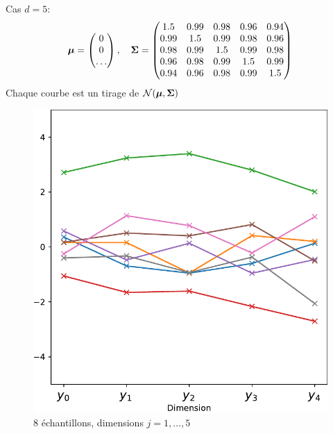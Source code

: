 \documentclass[xcolor=svgnames, t]{beamer}
\newcommand{\vectorx}[1]{\boldsymbol{\MakeLowercase{\mathbf{#1}}}}
\newcommand{\matrixx}[1]{\boldsymbol{\MakeUppercase{#1}}}
\begin{document}
\begin{frame}
  Cas $d=5$:
  \begin{equation*}
    \vectorx{\mu}
    =
    \begin{pmatrix}
      0 \\
      0 \\
      \dots
    \end{pmatrix},
    \quad
    \matrixx{\Sigma}
    =
    \begin{pmatrix}
      1.5 & 0.99 & 0.98 & 0.96 & 0.94 \\
      0.99 & 1.5 & 0.99 & 0.98 & 0.96 \\
      0.98 & 0.99 & 1.5 & 0.99 & 0.98 \\
      0.96 & 0.98 & 0.99 & 1.5 & 0.99 \\
      0.94 & 0.96 & 0.98 & 0.99 & 1.5
      \end{pmatrix}
  \end{equation*}
  Chaque courbe est un tirage de $\mathcal{N}(\vectorx{\mu} , \matrixx{\Sigma})$
  \begin{figure}[ht]
    \includegraphics[scale=0.3]{gaussian_5d_valuevsindex.pdf}
    \caption{$8$ échantillons, dimensions $j=1, \dots, 5$}
  \end{figure}
\end{frame}
\end{document}
